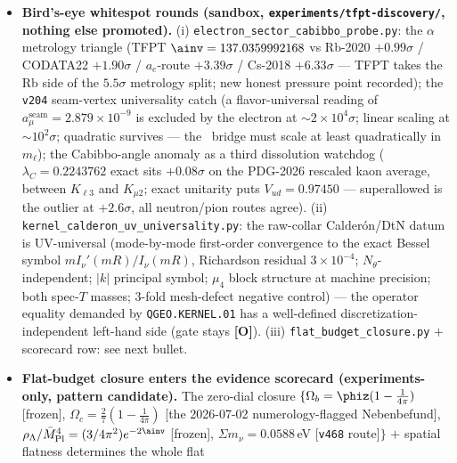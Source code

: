 \documentclass[11pt]{article}
\providecommand{\mO}{\textbf{[O]}}\providecommand{\mX}{\textbf{[X]}}
\providecommand{\Mbar}{\bar M_{\mathrm{Pl}}}\providecommand{\Z}{\mathbb{Z}}\providecommand{\PP}{\mathbb{P}}
\begin{document}
\begin{itemize}[leftmargin=1.5em]
$7/7$ checks; suite green through \texttt{v472} (466 modules); numerical (dense eigh $+$ FHS twist grid),
Python-only by nature. Papers updated: \texttt{tfpt\_1} (sixth honest step in the EM closure),
\texttt{tfpt\_research\_contracts} (residual certification), \texttt{tfpt\_safeguards} ($\alpha$-form
lever), root \texttt{README}, \texttt{zenodo\_description.html}. Exploration original:
\texttt{experiments/tfpt-discovery/quillen\_detline\_twist\_moduli.py} (same day).
\item \textbf{Bird's-eye whitespot rounds (sandbox, \texttt{experiments/tfpt-discovery/}, nothing else
promoted).} (i) \texttt{electron\_sector\_cabibbo\_probe.py}: the $\alpha$ metrology triangle (TFPT
$\ainv=137.0359992168$ vs Rb-2020 $+0.99\sigma$ / CODATA22 $+1.90\sigma$ / $a_e$-route $+3.39\sigma$ /
Cs-2018 $+6.33\sigma$ --- TFPT takes the Rb side of the $5.5\sigma$ metrology split; new honest pressure
point recorded); the \texttt{v204} seam-vertex universality catch (a flavor-universal reading of
$a_\mu^{\mathrm{seam}}=2.879\times10^{-9}$ is excluded by the electron at ${\sim}2\times10^4\sigma$; linear
scaling at ${\sim}10^2\sigma$; quadratic survives --- the \mC\ bridge must scale at least quadratically in
$m_\ell$); the Cabibbo-angle anomaly as a third dissolution watchdog ($\lambda_C=0.2243762$ exact sits
$+0.08\sigma$ on the PDG-2026 rescaled kaon average, between $K_{\ell3}$ and $K_{\mu2}$; exact unitarity
puts $V_{ud}=0.97450$ --- superallowed is the outlier at $+2.6\sigma$, all neutron/pion routes agree).
(ii) \texttt{kernel\_calderon\_uv\_universality.py}: the raw-collar Calder\'on/DtN datum is UV-universal
(mode-by-mode first-order convergence to the exact Bessel symbol $m I_\nu'(mR)/I_\nu(mR)$, Richardson
residual $3\times10^{-4}$; $N_\theta$-independent; $|k|$ principal symbol; $\mu_4$ block structure at
machine precision; both spec-$T$ masses; $3$-fold mesh-defect negative control) --- the operator equality
demanded by \texttt{QGEO.KERNEL.01} has a well-defined discretization-independent left-hand side (gate
stays \mO). (iii) \texttt{flat\_budget\_closure.py} $+$ scorecard row: see next bullet.
\item \textbf{Flat-budget closure enters the evidence scorecard (experiments-only, pattern candidate).}
The zero-dial closure $\{\Omega_b=\phiz(1-\tfrac{1}{4\pi})$ [frozen], $\Omega_c=\tfrac27(1-\tfrac{1}{4\pi})$
[the 2026-07-02 numerology-flagged Nebenbefund], $\rho_\Lambda/\Mbar^4=(3/4\pi^2)e^{-2\ainv}$ [frozen],
$\Sigma m_\nu=0.0588$\,eV [\texttt{v468} route]$\}$ $+$ spatial flatness determines the whole flat

\end{itemize}
\end{document}
